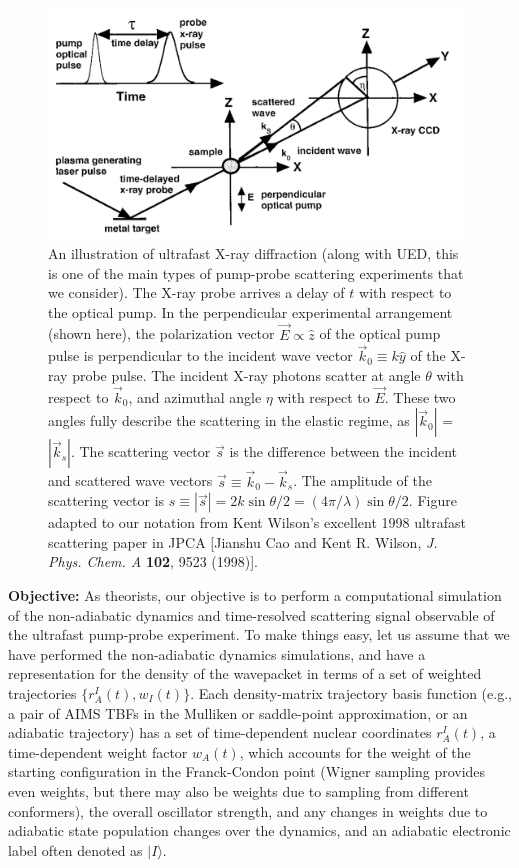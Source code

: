 \documentclass[fleqn,oneside,12pt]{article}
\begin{document}
\begin{figure}[h!]
\begin{center}
\includegraphics[width=11cm]{figures/schem}
\end{center}
\caption{An illustration of ultrafast X-ray diffraction (along with UED, this is
one of the main types of pump-probe scattering experiments that we consider).
The X-ray probe arrives a delay of $t$ with respect to the optical pump. In the
perpendicular experimental arrangement (shown here), the polarization vector
$\vec E \propto \hat z$ of the optical pump pulse is perpendicular to the
incident wave vector $\vec k_0 \equiv k \hat y$ of the X-ray probe pulse. The
incident X-ray photons scatter at angle $\theta$ with respect to $\vec k_0$, and
azimuthal angle $\eta$ with respect to $\vec E$. These two angles fully describe
the scattering in the elastic regime, as $|\vec k_0|$ = $|\vec k_s|$. The
scattering vector $\vec s$ is the difference between the incident and scattered
wave vectors $\vec s \equiv \vec k_0 - \vec k_s$. The amplitude of the
scattering vector is $s \equiv |\vec s| = 2 k \sin \theta / 2 = (4 \pi /
\lambda) \sin \theta / 2$. Figure adapted to our notation from Kent Wilson's
excellent 1998 ultrafast scattering paper in JPCA [Jianshu Cao and Kent R.
Wilson, \emph{J. Phys. Chem. A} \textbf{102}, 9523 (1998)].}
\label{fig:schem}
\end{figure}

\textbf{Objective:} As theorists, our objective is to perform a computational
simulation of the non-adiabatic dynamics and time-resolved scattering signal
observable of the ultrafast pump-probe experiment. To make things easy, let us
assume that we have performed the non-adiabatic dynamics simulations, and have a
representation for the density of the wavepacket in terms of a set of weighted
trajectories $\{ r_{A}^{I} (t), w_{I} (t) \}$. Each density-matrix trajectory
basis function (e.g., a pair of AIMS TBFs in the Mulliken or saddle-point
approximation, or an adiabatic trajectory) has a set of time-dependent nuclear
coordinates $r_{A}^{I} (t)$, a time-dependent weight factor $w_{A} (t)$, which
accounts for the weight of the starting configuration in the Franck-Condon point
(Wigner sampling provides even weights, but there may also be weights due to
sampling from different conformers), the overall oscillator strength, and any
changes in weights due to adiabatic state population changes over the dynamics,
and an adiabatic electronic label often denoted as $|I\rangle$.
\end{document}

